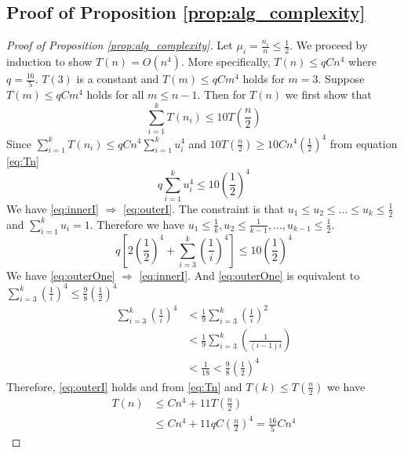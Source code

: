 \subsection{Proof of Proposition \ref{prop:alg_complexity}}
\begin{proof}[Proof of Proposition \ref{prop:alg_complexity}]
Let $\mu_i = \frac{n_i}{n} \leq \frac{1}{2}$. We proceed by induction to show $T(n) = O(n^4)$. More specifically, $T(n) \leq q C n^4$ where $ q = \frac{16}{5}$. $T(3)$ is a constant and $T(m) \leq q C m^4$ holds for $m=3$. Suppose
	$T(m) \leq qC m^4$ holds for all $m \leq n-1$. Then for $T(n)$
	we first show that 
	\begin{equation}\label{eq:outerI}
	\sum_{i=1}^k T(n_i) \leq 10 T(\frac{n}{2})
	\end{equation}
	Since $\sum_{i=1}^k T(n_i) \leq qC n^4\sum_{i=1}^k u_i^4$ and $10 T(\frac{n}{2}) \geq 10Cn^4 (\frac{1}{2})^4$ from equation \eqref{eq:Tn}
	\begin{equation}\label{eq:innerI}
       q\sum_{i=1}^k u_i^4 \leq 10 (\frac{1}{2})^4 
	\end{equation}
	We have \eqref{eq:innerI} $\Rightarrow$ \eqref{eq:outerI}. The constraint is that $u_1\leq u_2 \leq \dots \leq u_k \leq \frac{1}{2}$ and $\sum_{i=1}^k u_i = 1$. Therefore we have $u_1 \leq \frac{1}{k}, u_2 \leq \frac{1}{k-1}, \dots, u_{k-1} \leq \frac{1}{2}$.
	\begin{equation}\label{eq:outerOne}
	 q[2(\frac{1}{2})^4 + \sum_{i=3}^k (\frac{1}{i})^4] \leq 10 (\frac{1}{2})^4
	\end{equation}
	We have \eqref{eq:outerOne} $\Rightarrow$ \eqref{eq:innerI}. And \eqref{eq:outerOne} is equivalent to
	$\sum_{i=3}^k (\frac{1}{i})^4 \leq \frac{9}{8}(\frac{1}{2})^4$
	\begin{align*}
		\sum_{i=3}^k (\frac{1}{i})^4 & < \frac{1}{9}\sum_{i=3}^k (\frac{1}{i})^2 \\
		& < \frac{1}{9}\sum_{i=3}^k (\frac{1}{(i-1)i}) \\
		& < \frac{1}{18} < \frac{9}{8}(\frac{1}{2})^4
	\end{align*}
	Therefore, \eqref{eq:outerI} holds and from \eqref{eq:Tn} and $T(k) \leq T(\frac{n}{2})$ we have 
	\begin{align}
		T(n)  & \leq Cn^4 + 11T(\frac{n}{2}) \\
		& \leq C n^4 + 11 q C (\frac{n}{2})^4 = \frac{16}{5} C n^4
	\end{align}
\end{proof}	


